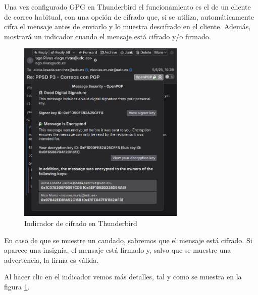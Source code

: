 \begin{tcolorbox}[
    colback=orange!5!white,
    colframe=orange!75!black,
    title=El indicador de cifrado
]
Una vez configurado GPG en Thunderbird el funcionamiento es el de un cliente de correo habitual, con una opción de cifrado que, si se utiliza, automáticamente cifra el mensaje antes de enviarlo y lo muestra descifrado en el cliente. Además, mostrará un indicador cuando el mensaje está cifrado y/o firmado.

\begin{figure}[H]
    \centering
    \includegraphics[width=8cm]{thunderbird-indicador.png}
    \caption{Indicador de cifrado en Thunderbird}
    \label{fig:indicador-cifrado}
\end{figure}

En caso de que se muestre un candado, sabremos que el mensaje está cifrado. Si aparece una insignia, el mensaje está firmado y, salvo que se muestre una advertencia, la firma es válida.

Al hacer clic en el indicador vemos más detalles, tal y como se muestra en la figura \ref{fig:indicador-cifrado}.
\end{tcolorbox}

